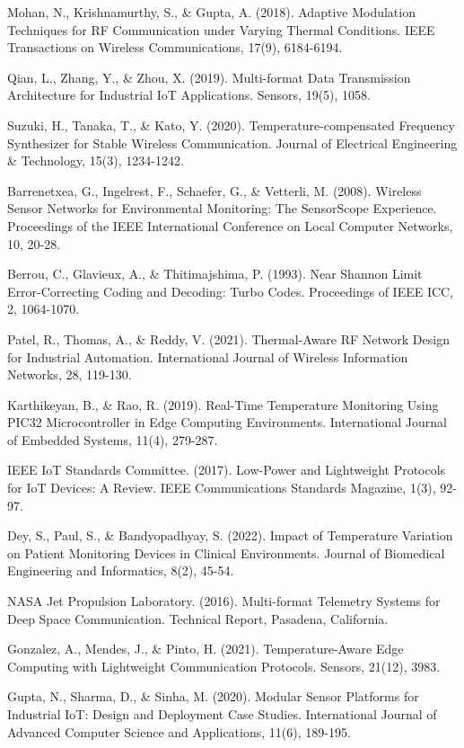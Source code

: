 \documentclass[12pt]{report}
\begin{document}
\begin{thebibliography}{9}
Mohan, N., Krishnamurthy, S., \& Gupta, A. (2018). Adaptive Modulation Techniques for RF Communication under Varying Thermal Conditions. IEEE Transactions on Wireless Communications, 17(9), 6184-6194.

Qian, L., Zhang, Y., \& Zhou, X. (2019). Multi-format Data Transmission Architecture for Industrial IoT Applications. Sensors, 19(5), 1058.

Suzuki, H., Tanaka, T., \& Kato, Y. (2020). Temperature-compensated Frequency Synthesizer for Stable Wireless Communication. Journal of Electrical Engineering \& Technology, 15(3), 1234-1242.

Barrenetxea, G., Ingelrest, F., Schaefer, G., \& Vetterli, M. (2008). Wireless Sensor Networks for Environmental Monitoring: The SensorScope Experience. Proceedings of the IEEE International Conference on Local Computer Networks, 10, 20-28.

Berrou, C., Glavieux, A., \& Thitimajshima, P. (1993). Near Shannon Limit Error-Correcting Coding and Decoding: Turbo Codes. Proceedings of IEEE ICC, 2, 1064-1070.

Patel, R., Thomas, A., \& Reddy, V. (2021). Thermal-Aware RF Network Design for Industrial Automation. International Journal of Wireless Information Networks, 28, 119-130.

Karthikeyan, B., \& Rao, R. (2019). Real-Time Temperature Monitoring Using PIC32 Microcontroller in Edge Computing Environments. International Journal of Embedded Systems, 11(4), 279-287.

IEEE IoT Standards Committee. (2017). Low-Power and Lightweight Protocols for IoT Devices: A Review. IEEE Communications Standards Magazine, 1(3), 92-97.

Dey, S., Paul, S., \& Bandyopadhyay, S. (2022). Impact of Temperature Variation on Patient Monitoring Devices in Clinical Environments. Journal of Biomedical Engineering and Informatics, 8(2), 45-54.

NASA Jet Propulsion Laboratory. (2016). Multi-format Telemetry Systems for Deep Space Communication. Technical Report, Pasadena, California.

Gonzalez, A., Mendes, J., \& Pinto, H. (2021). Temperature-Aware Edge Computing with Lightweight Communication Protocols. Sensors, 21(12), 3983.

Gupta, N., Sharma, D., \& Sinha, M. (2020). Modular Sensor Platforms for Industrial IoT: Design and Deployment Case Studies. International Journal of Advanced Computer Science and Applications, 11(6), 189-195.
\end{thebibliography}
\end{document}
